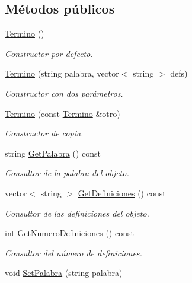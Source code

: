 \subsection*{Métodos públicos}
\begin{DoxyCompactItemize}
\item 
\mbox{\label{classTermino_ac3b1425fec4d38d78c5d36cb5fe8e728}} 
\hyperlink{classTermino_ac3b1425fec4d38d78c5d36cb5fe8e728}{Termino} ()
\begin{DoxyCompactList}\small\item\em Constructor por defecto. \end{DoxyCompactList}\item 
\hyperlink{classTermino_a9ec8e65752439d7f58be1a7ee7334e0b}{Termino} (string palabra, vector$<$ string $>$ defs)
\begin{DoxyCompactList}\small\item\em Constructor con dos parámetros. \end{DoxyCompactList}\item 
\hyperlink{classTermino_a5614ae8912f6aabd677762cc6d10f2c8}{Termino} (const \hyperlink{classTermino}{Termino} \&otro)
\begin{DoxyCompactList}\small\item\em Constructor de copia. \end{DoxyCompactList}\item 
string \hyperlink{classTermino_a9cff6f16a62ffa3c8c2c241a33cbd04d}{Get\+Palabra} () const
\begin{DoxyCompactList}\small\item\em Consultor de la palabra del objeto. \end{DoxyCompactList}\item 
vector$<$ string $>$ \hyperlink{classTermino_a11d0d5aa55842b440263fc2e0d24941f}{Get\+Definiciones} () const
\begin{DoxyCompactList}\small\item\em Consultor de las definiciones del objeto. \end{DoxyCompactList}\item 
int \hyperlink{classTermino_ad3aac507f0f33d89abf34db00f92606f}{Get\+Numero\+Definiciones} () const
\begin{DoxyCompactList}\small\item\em Consultor del número de definiciones. \end{DoxyCompactList}\item 
void \hyperlink{classTermino_a6d148c1d2aaaa5ebc40fc1eb6e34857a}{Set\+Palabra} (string palabra)

\end{DoxyCompactItemize}
